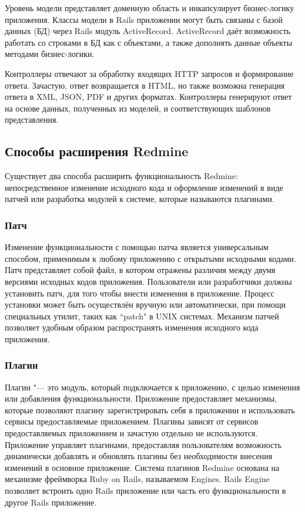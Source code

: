 Уровень модели представляет доменную область и инкапсулирует бизнес-логику
приложения. Классы модели в Rails приложении могут быть связаны с базой данных
(БД) через Rails модуль ActiveRecord. ActiveRecord даёт возможность работать со
строками в БД как с объектами, а также дополнять данные объекты методами
бизнес-логики.

Контроллеры отвечают за обработку входящих HTTP запросов и формирование ответа.
Зачастую, ответ возвращается в HTML, но также возможна генерация ответа в XML,
JSON, PDF и других форматах. Контроллеры генерируют ответ на основе данных,
полученных из моделей, и соответствующих шаблонов представления.

\subsection{Способы расширения Redmine}
Существует два способа расширить функциональность Redmine: непосредственное
изменение исходного кода и оформление изменений в виде патчей или разработка 
модулей к системе, которые называются плагинами.

\subsubsection{Патч}
Изменение функциональности с помощью патча является универсальным способом,
применимым к любому приложению с открытыми исходными кодами. Патч представляет
собой файл, в котором отражены различия между двумя версиями исходных кодов
приложения. Пользователи или разработчики должны установить патч, для того
чтобы внести изменения в приложение. Процесс установки может быть осуществлён
вручную или автоматически, при помощи специальных утилит, таких как ``patch" в
UNIX системах. Механизм патчей позволяет удобным образом распространять
изменения исходного кода приложения.

\subsubsection{Плагин}
Плагин "--- это модуль, который подключается к приложению, с целью изменения
или добавления функциональности. Приложение предоставляет механизмы, которые
позволяют плагину зарегистрировать себя в приложении и использовать сервисы
предоставляемые приложением. Плагины зависят от сервисов предоставляемых
приложением и зачастую отдельно не используются. Приложение управляет
плагинами, предоставляя пользователям возможность динамически добавлять и
обновлять плагины без необходимости внесения изменений в основное приложение.
Система плагинов Redmine основана на механизме фреймворка Ruby on Rails,
называемом Engines. Rails Engine позволяет встроить одно Rails приложение или
часть его функциональности в другое Rails приложение.

